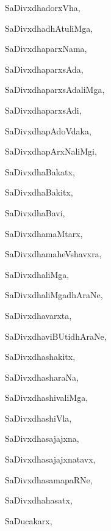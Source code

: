 \begin{multicols}{3}
{\noindent
{SaDivxdhadorxVha}, \pageref{SaDivxdhadorxVha}

\noindent
{SaDivxdhadhAtuliMga}, \pageref{SaDivxdhadhAtuliMga}

\noindent
{SaDivxdhaparxNama}, \pageref{SaDivxdhaparxNama}

\noindent
{SaDivxdhaparxsAda}, \pageref{SaDivxdhaparxsAda}

\noindent
{SaDivxdhaparxsAdaliMga}, \pageref{SaDivxdhaparxsAdaliMga}

\noindent
{SaDivxdhaparxsAdi}, \pageref{SaDivxdhaparxsAdi}

\noindent
{SaDivxdhapAdoVdaka}, \pageref{SaDivxdhapAdoVdaka}

\noindent
{SaDivxdhapArxNaliMgi}, \pageref{SaDivxdhapArxNaliMgi}

\noindent
{SaDivxdhaBakatx}, \pageref{SaDivxdhaBakatx}

\noindent
{SaDivxdhaBakitx}, \pageref{SaDivxdhaBakitx}

\noindent
{SaDivxdhaBavi}, \pageref{SaDivxdhaBavi}

\noindent
{SaDivxdhamaMtarx}, \pageref{SaDivxdhamaMtarx}

\noindent
{SaDivxdhamaheVshavxra}, \pageref{SaDivxdhamaheVshavxra}

\noindent
{SaDivxdhaliMga}, \pageref{SaDivxdhaliMga}

\noindent
{SaDivxdhaliMgadhAraNe}, \pageref{SaDivxdhaliMgadhAraNe}

\noindent
{SaDivxdhavarxta}, \pageref{SaDivxdhavarxta}

\noindent
{SaDivxdhaviBUtidhAraNe}, \pageref{SaDivxdhaviBUtidhAraNe}

\noindent
{SaDivxdhashakitx}, \pageref{SaDivxdhashakitx}

\noindent
{SaDivxdhasharaNa}, \pageref{SaDivxdhasharaNa}

\noindent
{SaDivxdhashivaliMga}, \pageref{SaDivxdhashivaliMga}

\noindent
{SaDivxdhashiVla}, \pageref{SaDivxdhashiVla}

\noindent
{SaDivxdhasajajxna}, \pageref{SaDivxdhasajajxna}

\noindent
{SaDivxdhasajajxnatavx}, \pageref{SaDivxdhasajajxnatavx}

\noindent
{SaDivxdhasamapaRNe}, \pageref{SaDivxdhasamapaRNe}

\noindent
{SaDivxdhahasatx}, \pageref{SaDivxdhahasatx}

\noindent
{SaDucakarx}, \pageref{SaDucakarx}

}
\end{multicols}
